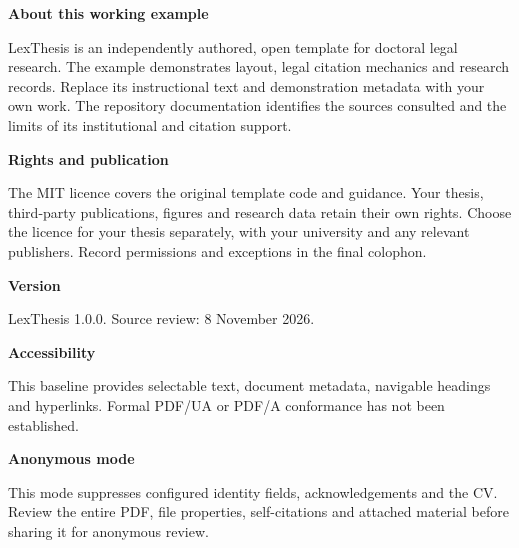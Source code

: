 \thispagestyle{plain}
\begingroup\small\singlespacing
\noindent\textbf{About this working example}\par\medskip
LexThesis is an independently authored, open template for doctoral legal research.
The example demonstrates layout, legal citation mechanics and research records.
Replace its instructional text and demonstration metadata with your own work.
The repository documentation identifies the sources consulted and the limits of
its institutional and citation support.
\par\medskip
\noindent\textbf{Rights and publication}\par
The MIT licence covers the original template code and guidance. Your thesis,
third-party publications, figures and research data retain their own rights.
Choose the licence for your thesis separately, with your university and any
relevant publishers. Record permissions and exceptions in the final colophon.
\par\medskip
\noindent\textbf{Version}\par
LexThesis 1.0.0. Source review: 8 November 2026.
\par\medskip
\noindent\textbf{Accessibility}\par
This baseline provides selectable text, document metadata, navigable headings
and hyperlinks. Formal PDF/UA or PDF/A conformance has not been established.
\par\medskip
\ifLawAnonymous
  \noindent\textbf{Anonymous mode}\par
  This mode suppresses configured identity fields, acknowledgements and the CV.
  Review the entire PDF, file properties, self-citations and attached material
  before sharing it for anonymous review.
\else
\fi
\endgroup
\cleardoublepage
